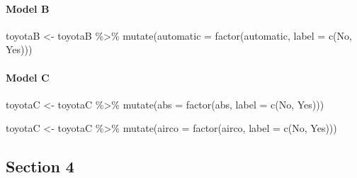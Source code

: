 \documentclass[
]{article}
\newenvironment{Shaded}{\begin{snugshade}}{\end{snugshade}}
\newcommand{\AttributeTok}[1]{\textcolor[rgb]{0.77,0.63,0.00}{#1}}
\newcommand{\FunctionTok}[1]{\textcolor[rgb]{0.00,0.00,0.00}{#1}}
\newcommand{\NormalTok}[1]{#1}
\newcommand{\OtherTok}[1]{\textcolor[rgb]{0.56,0.35,0.01}{#1}}
\newcommand{\SpecialCharTok}[1]{\textcolor[rgb]{0.00,0.00,0.00}{#1}}
\newcommand{\StringTok}[1]{\textcolor[rgb]{0.31,0.60,0.02}{#1}}
\begin{document}
\hypertarget{model-b-2}{%
\paragraph{Model B}\label{model-b-2}}

\begin{Shaded}
\begin{Highlighting}[]
\NormalTok{toyotaB }\OtherTok{\textless{}{-}}\NormalTok{ toyotaB }\SpecialCharTok{\%\textgreater{}\%} 
  \FunctionTok{mutate}\NormalTok{(}\AttributeTok{automatic =} \FunctionTok{factor}\NormalTok{(automatic,}
                              \AttributeTok{label =} \FunctionTok{c}\NormalTok{(}\StringTok{\textquotesingle{}No\textquotesingle{}}\NormalTok{, }\StringTok{\textquotesingle{}Yes\textquotesingle{}}\NormalTok{)))}
\end{Highlighting}
\end{Shaded}

\hypertarget{model-c-2}{%
\paragraph{Model C}\label{model-c-2}}

\begin{Shaded}
\begin{Highlighting}[]
\NormalTok{toyotaC }\OtherTok{\textless{}{-}}\NormalTok{ toyotaC }\SpecialCharTok{\%\textgreater{}\%}
  \FunctionTok{mutate}\NormalTok{(}\AttributeTok{abs =} \FunctionTok{factor}\NormalTok{(abs,}
                      \AttributeTok{label =} \FunctionTok{c}\NormalTok{(}\StringTok{\textquotesingle{}No\textquotesingle{}}\NormalTok{, }\StringTok{\textquotesingle{}Yes\textquotesingle{}}\NormalTok{)))}
\end{Highlighting}
\end{Shaded}

\begin{Shaded}
\begin{Highlighting}[]
\NormalTok{toyotaC }\OtherTok{\textless{}{-}}\NormalTok{ toyotaC }\SpecialCharTok{\%\textgreater{}\%}
  \FunctionTok{mutate}\NormalTok{(}\AttributeTok{airco =} \FunctionTok{factor}\NormalTok{(airco,}
                      \AttributeTok{label =} \FunctionTok{c}\NormalTok{(}\StringTok{\textquotesingle{}No\textquotesingle{}}\NormalTok{, }\StringTok{\textquotesingle{}Yes\textquotesingle{}}\NormalTok{)))}
\end{Highlighting}
\end{Shaded}

\hypertarget{section-4}{%
\subsection{Section 4}\label{section-4}}
\end{document}
